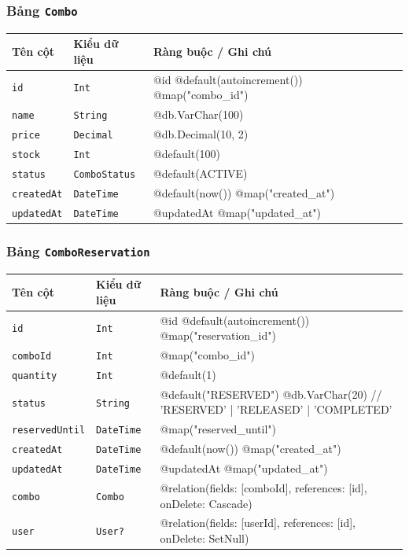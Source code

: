 \subsubsection{Bảng \texttt{Combo}}
\begin{longtable}{|p{3.6cm}|p{3.0cm}|p{8.9cm}|}
\hline
\rowcolor{headerblue} \textbf{Tên cột} & \textbf{Kiểu dữ liệu} & \textbf{Ràng buộc / Ghi chú} \\ \hline
\endhead
\texttt{id} & \texttt{Int} & \small @id @default(autoincrement()) @map("combo\_id") \\ \hline
\texttt{name} & \texttt{String} & \small @db.VarChar(100) \\ \hline
\texttt{price} & \texttt{Decimal} & \small @db.Decimal(10, 2) \\ \hline
\texttt{stock} & \texttt{Int} & \small @default(100) \\ \hline
\texttt{status} & \texttt{ComboStatus} & \small @default(ACTIVE) \\ \hline
\texttt{createdAt} & \texttt{DateTime} & \small @default(now()) @map("created\_at") \\ \hline
\texttt{updatedAt} & \texttt{DateTime} & \small @updatedAt @map("updated\_at") \\ \hline
\end{longtable}

\subsubsection{Bảng \texttt{ComboReservation}}
\begin{longtable}{|p{3.6cm}|p{3.0cm}|p{8.9cm}|}
\hline
\rowcolor{headerblue} \textbf{Tên cột} & \textbf{Kiểu dữ liệu} & \textbf{Ràng buộc / Ghi chú} \\ \hline
\endhead
\texttt{id} & \texttt{Int} & \small @id @default(autoincrement()) @map("reservation\_id") \\ \hline
\texttt{comboId} & \texttt{Int} & \small @map("combo\_id") \\ \hline
\texttt{quantity} & \texttt{Int} & \small @default(1) \\ \hline
\texttt{status} & \texttt{String} & \small @default("RESERVED") @db.VarChar(20) // 'RESERVED' | 'RELEASED' | 'COMPLETED' \\ \hline
\texttt{reservedUntil} & \texttt{DateTime} & \small @map("reserved\_until") \\ \hline
\texttt{createdAt} & \texttt{DateTime} & \small @default(now()) @map("created\_at") \\ \hline
\texttt{updatedAt} & \texttt{DateTime} & \small @updatedAt @map("updated\_at") \\ \hline
\texttt{combo} & \texttt{Combo} & \small @relation(fields: [comboId], references: [id], onDelete: Cascade) \\ \hline
\texttt{user} & \texttt{User?} & \small @relation(fields: [userId], references: [id], onDelete: SetNull) \\ \hline
\end{longtable}

